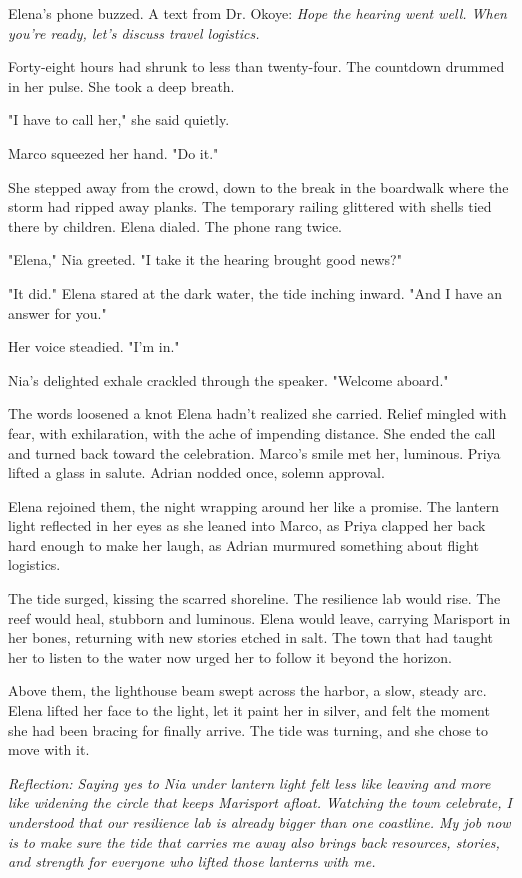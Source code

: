 Elena's phone buzzed. A text from Dr. Okoye: \textit{Hope the hearing went well. When you're ready, let's discuss travel logistics.}\

Forty-eight hours had shrunk to less than twenty-four. The countdown drummed in her pulse. She took a deep breath.

"I have to call her," she said quietly.

Marco squeezed her hand. "Do it."

She stepped away from the crowd, down to the break in the boardwalk where the storm had ripped away planks. The temporary railing glittered with shells tied there by children. Elena dialed. The phone rang twice.

"Elena," Nia greeted. "I take it the hearing brought good news?"

"It did." Elena stared at the dark water, the tide inching inward. "And I have an answer for you."

Her voice steadied. "I'm in."

Nia's delighted exhale crackled through the speaker. "Welcome aboard."

The words loosened a knot Elena hadn't realized she carried. Relief mingled with fear, with exhilaration, with the ache of impending distance. She ended the call and turned back toward the celebration. Marco's smile met her, luminous. Priya lifted a glass in salute. Adrian nodded once, solemn approval.

Elena rejoined them, the night wrapping around her like a promise. The lantern light reflected in her eyes as she leaned into Marco, as Priya clapped her back hard enough to make her laugh, as Adrian murmured something about flight logistics.

The tide surged, kissing the scarred shoreline. The resilience lab would rise. The reef would heal, stubborn and luminous. Elena would leave, carrying Marisport in her bones, returning with new stories etched in salt. The town that had taught her to listen to the water now urged her to follow it beyond the horizon.

Above them, the lighthouse beam swept across the harbor, a slow, steady arc. Elena lifted her face to the light, let it paint her in silver, and felt the moment she had been bracing for finally arrive. The tide was turning, and she chose to move with it.

\noindent\textit{Reflection: Saying yes to Nia under lantern light felt less like leaving and more like widening the circle that keeps Marisport afloat. Watching the town celebrate, I understood that our resilience lab is already bigger than one coastline. My job now is to make sure the tide that carries me away also brings back resources, stories, and strength for everyone who lifted those lanterns with me.}

